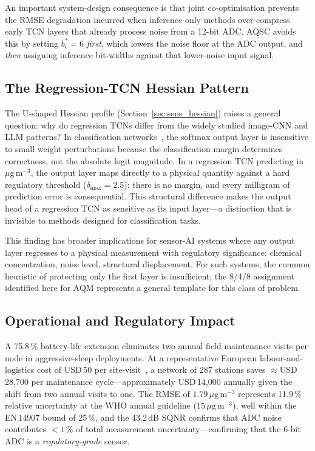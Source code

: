 \documentclass[12pt,a4paper]{article}
\begin{document}
An important system-design consequence is that joint co-optimisation
prevents the RMSE degradation incurred when inference-only methods
over-compress early TCN layers that already process noise from a
12-bit ADC.
AQSC avoids this by setting $b_c^*=6$ \textit{first}, which lowers
the noise floor at the ADC output, and \textit{then} assigning
inference bit-widths against that lower-noise input signal.

\subsection{The Regression-TCN Hessian Pattern}
\label{sec:disc_hessian}

The U-shaped Hessian profile (Section~\ref{sec:sens_hessian}) raises
a general question: why do regression TCNs differ from the widely
studied image-CNN and LLM patterns?
In classification networks~\cite{frantar2023gptq,dong2021hawqv3},
the softmax output layer is insensitive to small weight perturbations
because the classification margin determines correctness, not the
absolute logit magnitude.
In a regression TCN predicting  in $\mu$g\,m$^{-3}$,
the output layer maps directly to a physical quantity against a hard
regulatory threshold ($\delta_\mathrm{max}=2.5$): there is no margin,
and every milligram of prediction error is consequential.
This structural difference makes the output head of a regression TCN
as sensitive as its input layer---a distinction that is invisible to
methods designed for classification tasks.

This finding has broader implications for sensor-AI systems where any
output layer regresses to a physical measurement with regulatory
significance: chemical concentration, noise level, structural displacement.
For such systems, the common heuristic of protecting only the first
layer is insufficient; the 8/4/8 assignment identified here for AQM
represents a general template for this class of problem.

\subsection{Operational and Regulatory Impact}
\label{sec:disc_ops}

A 75.8\,\% battery-life extension eliminates two annual field
maintenance visits per node in aggressive-sleep deployments.
At a representative European labour-and-logistics cost of
USD\,50 per site-visit~\cite{euaqd2023}, a network of 287 stations
saves $\approx$USD\,28{,}700 per maintenance cycle---approximately
USD\,14{,}000 annually given the shift from two annual visits
to one.
The  RMSE of $1.79\,\mu\mathrm{g\,m^{-3}}$ represents
11.9\,\% relative uncertainty at the WHO annual guideline
($15\,\mu\mathrm{g\,m^{-3}}$), well within the EN\,14907 bound of
25\,\%, and the 43.2\,dB SQNR confirms that ADC noise contributes
$<1\,\%$ of total measurement uncertainty---confirming that the
6-bit ADC is a \textit{regulatory-grade} sensor.
\end{document}
